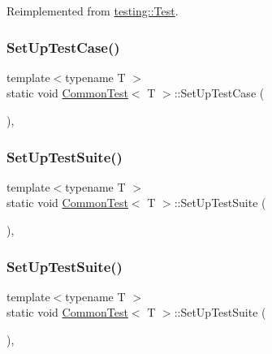 Reimplemented from \mbox{\hyperlink{classtesting_1_1_test_a190315150c303ddf801313fd1a777733}{testing\+::\+Test}}.

\mbox{\label{class_common_test_a6edd90f32f45cc49e4a423b22bd770ce}} 
\subsubsection{\texorpdfstring{SetUpTestCase()}{SetUpTestCase()}}
{\footnotesize\ttfamily template$<$typename T $>$ \\
static void \mbox{\hyperlink{class_common_test}{Common\+Test}}$<$ T $>$\+::Set\+Up\+Test\+Case (\begin{DoxyParamCaption}{ }\end{DoxyParamCaption})\hspace{0.3cm}{\ttfamily [inline]}, {\ttfamily [static]}}

\mbox{\label{class_common_test_a34d4de46bf01a38d305277a9b83c67a1}} 
\subsubsection{\texorpdfstring{SetUpTestSuite()}{SetUpTestSuite()}\hspace{0.1cm}{\footnotesize\ttfamily [1/2]}}
{\footnotesize\ttfamily template$<$typename T $>$ \\
static void \mbox{\hyperlink{class_common_test}{Common\+Test}}$<$ T $>$\+::Set\+Up\+Test\+Suite (\begin{DoxyParamCaption}{ }\end{DoxyParamCaption})\hspace{0.3cm}{\ttfamily [inline]}, {\ttfamily [static]}}

\mbox{\label{class_common_test_a34d4de46bf01a38d305277a9b83c67a1}} 
\subsubsection{\texorpdfstring{SetUpTestSuite()}{SetUpTestSuite()}\hspace{0.1cm}{\footnotesize\ttfamily [2/2]}}
{\footnotesize\ttfamily template$<$typename T $>$ \\
static void \mbox{\hyperlink{class_common_test}{Common\+Test}}$<$ T $>$\+::Set\+Up\+Test\+Suite (\begin{DoxyParamCaption}{ }\end{DoxyParamCaption})\hspace{0.3cm}{\ttfamily [inline]}, {\ttfamily [static]}}


